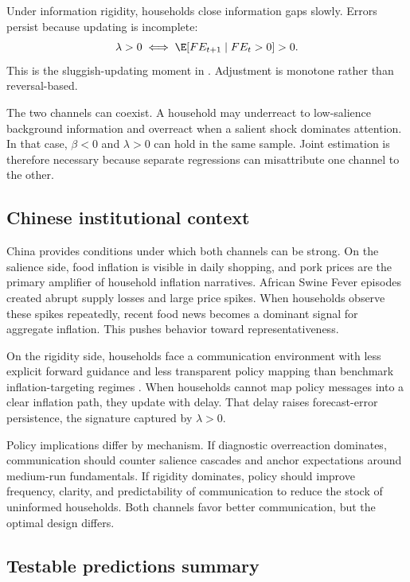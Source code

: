 Under information rigidity, households close information gaps slowly. Errors
persist because updating is incomplete:
\begin{equation}\label{eq:rigidity_prediction}
  \lambda > 0 \;\Longleftrightarrow\; \E[FE_{t+1}\mid FE_t>0] > 0.
\end{equation}
This is the sluggish-updating moment in \citet{Coibion2015}. Adjustment is
monotone rather than reversal-based.

The two channels can coexist. A household may underreact to low-salience
background information and overreact when a salient shock dominates attention.
In that case, $\beta<0$ and $\lambda>0$ can hold in the same sample. Joint
estimation is therefore necessary because separate regressions can misattribute
one channel to the other.

\subsection{Chinese institutional context}\label{sec:china_context}

China provides conditions under which both channels can be strong. On the
salience side, food inflation is visible in daily shopping, and pork prices
are the primary amplifier of household inflation narratives. African Swine
Fever episodes created abrupt supply losses and large price spikes. When
households observe these spikes repeatedly, recent food news becomes a dominant
signal for aggregate inflation. This pushes behavior toward representativeness.

On the rigidity side, households face a communication environment with less
explicit forward guidance and less transparent policy mapping than benchmark
inflation-targeting regimes \citep{Chen2022}. When households cannot map policy
messages into a clear inflation path, they update with delay. That delay raises
forecast-error persistence, the signature captured by $\lambda>0$.

Policy implications differ by mechanism. If diagnostic overreaction dominates,
communication should counter salience cascades and anchor expectations around
medium-run fundamentals. If rigidity dominates, policy should improve
frequency, clarity, and predictability of communication to reduce the stock of
uninformed households. Both channels favor better communication, but the
optimal design differs.

\subsection{Testable predictions summary}\label{sec:testable_predictions}

